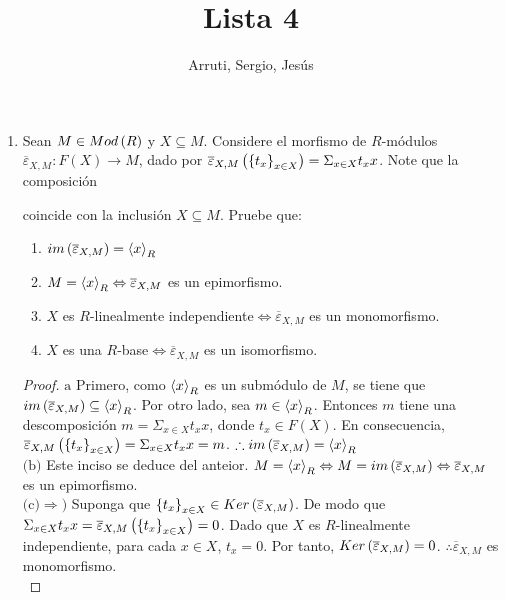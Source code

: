 \documentclass{article}
\title{Lista 4}
\author{Arruti, Sergio, Jesús}
\date{}
\begin{document}
\maketitle

\begin{enumerate}[label=\textbf{Ej \arabic*.}]
	\item Sean $M \in Mod\left(R\right)$ y $X \subseteq M$. Considere el morfismo de $R$-módulos $\overline{\varepsilon}_{X,M}:F(X) \longrightarrow M$, dado por $\overline{\varepsilon}_{X,M}\left({\left\{{t}_{x}\right\}}_{x\in X}\right)=\displaystyle\Sigma_{x \in X}t_{x}x$. Note que la composición
	coincide con la inclusión $X \subseteq M$. Pruebe que:
	\begin{enumerate}
		\item $im\left(\overline{\varepsilon}_{X,M}\right)=\left< x\right>_{R}$
		\item $M=\left< x\right>_{R}\Leftrightarrow\overline{\varepsilon}_{X,M}$ es un epimorfismo.
		\item $X$ es $R$-linealmente independiente$\Leftrightarrow\overline{\varepsilon}_{X,M}$ es un monomorfismo.
		\item $X$ es una $R$-base$\Leftrightarrow\overline{\varepsilon}_{X,M}$ es un isomorfismo.
	\end{enumerate}
	\begin{proof}
		$\boxed{\text{a}}$ Primero, como $\left< x\right>_{R}$ es un submódulo de $M$, se tiene que $im\left(\overline{\varepsilon}_{X,M}\right)\subseteq\left< x\right>_{R}$. Por otro lado, sea $m\in\left< x\right>_{R}$. Entonces $m$ tiene una descomposición $m=\displaystyle\Sigma_{x \in X}t_{x}x$, donde $t_{x} \in F(X)$. En consecuencia, $\overline{\varepsilon}_{X,M}\left({\left\{{t}_{x}\right\}}_{x\in X}\right)=\displaystyle\Sigma_{x \in X}t_{x}x=m$. $\therefore im\left(\overline{\varepsilon}_{X,M}\right)=\left< x\right>_{R}$\\
		
		$\boxed{\text{(b)}}$ Este inciso se deduce del anteior. $M=\left< x\right>_{R}\Leftrightarrow M=im\left(\overline{\varepsilon}_{X,M}\right)\Leftrightarrow\overline{\varepsilon}_{X,M}$ es un epimorfismo.\\
		
		$\boxed{\text{(c)}} \boxed{\Rightarrow )}$ Suponga que ${\left\{{t}_{x}\right\}}_{x\in X} \in Ker\left(\overline{\varepsilon}_{X,M}\right)$. De modo que $\displaystyle\Sigma_{x \in X}t_{x}x=\overline{\varepsilon}_{X,M}\left({\left\{{t}_{x}\right\}}_{x\in X}\right)=0$. Dado que $X$ es $R$-linealmente independiente, para cada $x \in X$, $t_{x}=0$. Por tanto, $Ker\left(\overline{\varepsilon}_{X,M}\right)=0$. $\therefore\overline{\varepsilon}_{X,M}$ es monomorfismo.\\
		

\end{proof}
\end{enumerate}
\end{document}
